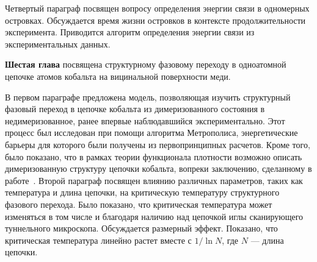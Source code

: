 \documentclass[10pt]{book}
\begin{document}
Четвертый параграф посвящен вопросу определения энергии связи в одномерных островках. Обсуждается время жизни островков в контексте продолжительности эксперимента. Приводится алгоритм определения энергии связи из экспериментальных данных.


\textbf{Шестая глава} посвящена структурному фазовому переходу в одноатомной цепочке атомов кобальта на вицинальной поверхности меди.

В первом параграфе предложена модель, позволяющая изучить структурный фазовый переход в цепочке кобальта из димеризованного состояния в недимеризованное, ранее впервые наблюдавшийся экспериментально. Этот процесс был исследован при помощи алгоритма Метрополиса, энергетические барьеры для которого были получены из первопринципных расчетов. Кроме того, было показано, что в рамках теории функционала плотности возможно описать димеризованную структуру цепочки кобальта, вопреки заключению, сделанному в работе~\cite{PhysRevB.89.205427}.
Второй параграф посвящен влиянию различных параметров, таких как температура и длина цепочки, на критическую температуру структурного фазового перехода. Было показано, что критическая температура может изменяться в том числе и благодаря наличию над цепочкой иглы сканирующего туннельного микроскопа. Обсуждается размерный эффект. Показано, что критическая температура линейно растет вместе с $1/\ln N$, где $N$ --- длина цепочки.
\end{document}
